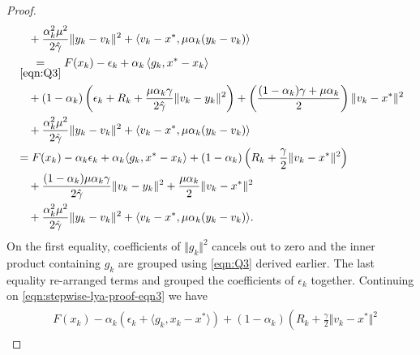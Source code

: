 \documentclass[12pt]{article}
\begin{document}
\begin{proof}
\begin{align}
\begin{split}
            & \quad 
                + \frac{\alpha_k^2 \mu^2}{2\hat \gamma}\Vert y_k - v_k\Vert^2
                + \langle v_k - x^*, \mu\alpha_k(y_k - v_k)\rangle
            \\
            &\underset{\eqref{eqn:Q3}}{=} 
            F(x_k) - \epsilon_k 
            + \alpha_k\left\langle 
                g_k, 
                x^* - x_k
            \right\rangle
            \\
            &\quad 
                + (1 - \alpha_k)
                \left(
                    \epsilon_k + R_k + 
                    \frac{\mu\alpha_k\gamma}{2\hat \gamma}
                    \Vert v_k - y_k\Vert^2
                \right)
                + 
                \left(
                \frac{(1 - \alpha_k)\gamma + \mu \alpha_k}{2} 
                \right)\Vert v_k - x^*\Vert^2
            \\
            & \quad 
                + \frac{\alpha_k^2 \mu^2}{2\hat \gamma}\Vert y_k - v_k\Vert^2
                + \langle v_k - x^*, \mu\alpha_k(y_k - v_k)\rangle
            \\
            &= 
            F(x_k) - \alpha_k\epsilon_k + \alpha_k\langle g_k, x^* - x_k\rangle
            + 
            (1 - \alpha_k)\left(
                R_k + \frac{\gamma}{2}\Vert v_k - x^*\Vert^2
            \right)
            \\&\quad 
                + \frac{(1 - \alpha_k)\mu\alpha_k\gamma}{2\hat \gamma}\Vert v_k - y_k\Vert^2
                + \frac{\mu \alpha_k}{2}\Vert v_k - x^*\Vert^2
            \\&\quad 
                + \frac{\alpha_k^2 \mu^2}{2\hat\gamma}\Vert y_k - v_k\Vert^2
                + \langle v_k - x^*, \mu\alpha_k(y_k - v_k)\rangle.     
        \end{split}
        \end{align}
        On the first equality, coefficients of $\Vert g_k\Vert^2$ cancels out to zero and the inner product containing $g_k$ are grouped
        using \eqref{eqn:Q3} derived earlier. 
        The last equality re-arranged terms and grouped the coefficients of $\epsilon_k$ together. 
        Continuing on \eqref{eqn:stepwise-lya-proof-eqn3} we have
        \begin{align}\label{eqn:stepwise-lya-proof-eqn3.1}
        \begin{split}
            &
            F(x_k) - \alpha_k(\epsilon_k + \langle g_k, x_k - x^*\rangle)
            + 
            (1 - \alpha_k)\left(
                R_k + \frac{\gamma}{2}\Vert v_k - x^*\Vert^2

\end{split}
\end{align}
\end{proof}
\end{document}
